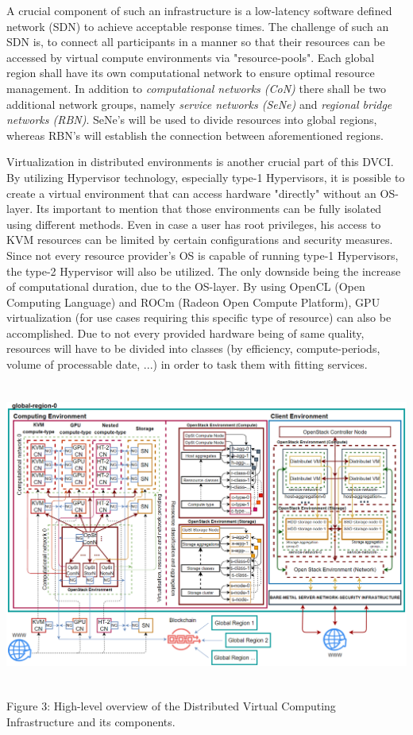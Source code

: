 \documentclass[]{article}
\begin{document}
A crucial component of such an infrastructure is a low-latency software defined network (SDN) to achieve acceptable response times.
The challenge of such an SDN is, to connect all participants in a manner so that their resources can be accessed by virtual compute environments via "resource-pools".
Each global region shall have its own computational network to ensure optimal resource management.
In addition to \textit{computational networks (CoN)} there shall be two additional network groups, namely \textit{service networks (SeNe)} and \textit{regional bridge networks (RBN)}.
SeNe's will be used to divide resources into global regions, whereas RBN's will establish the connection between aforementioned regions.

Virtualization in distributed environments is another crucial part of this DVCI.
By utilizing Hypervisor technology, especially type-1 Hypervisors, it is possible to create a virtual environment that can access hardware "directly" without an OS-layer.
Its important to mention that those environments can be fully isolated using different methods.
Even in case a user has root privileges, his access to KVM resources can be limited by certain configurations and security measures.
Since not every resource provider's OS is capable of running type-1 Hypervisors, the type-2 Hypervisor will also be utilized.
The only downside being the increase of computational duration, due to the OS-layer.
By using OpenCL (Open Computing Language) and ROCm (Radeon Open Compute Platform), GPU virtualization (for use cases requiring this specific type of resource) can also be accomplished.
Due to not every provided hardware being of same quality, resources will have to be divided into classes (by efficiency, compute-periods, volume of processable date, ...) in order to task them with fitting services.

\begin{center}
	\includegraphics[height=10cm]{dvci-arch-overview}
\end{center}
\begin{center}
	Figure 3: High-level overview of the Distributed Virtual Computing Infrastructure and its components.
\end{center}
\end{document}
